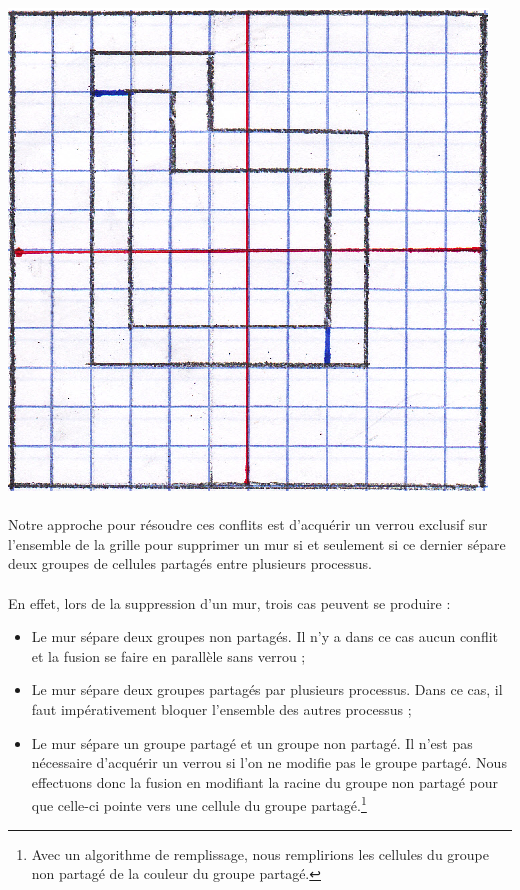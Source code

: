 \documentclass[a4paper,french]{article}
\begin{document}
    \begin{center}
        \includegraphics{schema_conflit.eps}
    \end{center}

    \paragraph{} Notre approche pour résoudre ces conflits est d'acquérir un
verrou exclusif sur l'ensemble de la grille pour supprimer un mur si et
seulement si ce dernier sépare deux groupes de cellules partagés entre plusieurs
processus.

    \paragraph{} En effet, lors de la suppression d'un mur, trois cas peuvent se
produire :

    \begin{itemize}
        \item Le mur sépare deux groupes non partagés. Il n'y a dans ce cas
aucun conflit et la fusion se faire en parallèle sans verrou ;
        \item Le mur sépare deux groupes partagés par plusieurs processus.
Dans ce cas, il faut impérativement bloquer l'ensemble des autres processus ;
        \item Le mur sépare un groupe partagé et un groupe non partagé. Il n'est
pas nécessaire d'acquérir un verrou si l'on ne modifie pas le groupe partagé.
Nous effectuons donc la fusion en modifiant la racine du groupe non partagé pour
que celle-ci pointe vers une cellule du groupe partagé.\footnote{Avec un
algorithme de remplissage, nous remplirions les cellules du groupe non partagé
de la couleur du groupe partagé.}
    \end{itemize}
\end{document}
